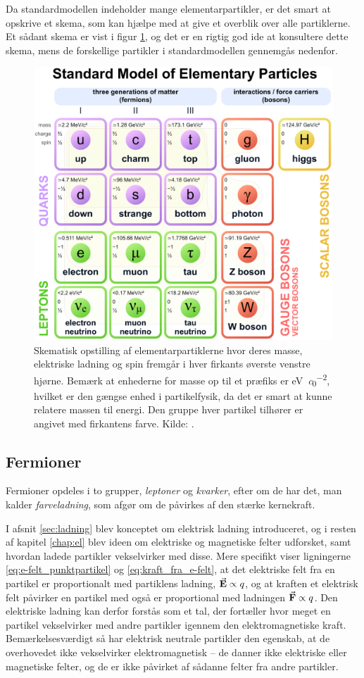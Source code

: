 Da standardmodellen indeholder mange elementarpartikler, er det smart at opskrive et skema, som kan hjælpe med at give et overblik over alle partiklerne. Et sådant skema er vist i figur \ref{fig:standardmodellen}, og det er en rigtig god ide at konsultere dette skema, mens de forskellige partikler i standardmodellen gennemgås nedenfor.
%
\begin{figure}
    \centering
    \includegraphics[width=.75\textwidth]{Partikel/figurer/standardmodellen.eps}
    \caption{Skematisk opstilling af elementarpartiklerne hvor deres masse, elektriske ladning og spin fremgår i hver firkants øverste venstre hjørne. Bemærk at enhederne for masse op til et præfiks er \si{\electronvolt\per\clight\squared}, hvilket er den gængse enhed i partikelfysik, da det er smart at kunne relatere massen til energi. Den gruppe hver partikel tilhører er angivet med firkantens farve. Kilde: \cite{StandardModelWikipedia}.}
    \label{fig:standardmodellen}
\end{figure}

\subsection{Fermioner}
Fermioner opdeles i to grupper, \emph{leptoner} og \emph{kvarker}, efter om de har det, man kalder \textit{farveladning}, som afgør om de påvirkes af den stærke kernekraft.

I afsnit \ref{sec:ladning} blev konceptet om elektrisk ladning introduceret, og i resten af kapitel \ref{chap:el} blev ideen om elektriske og magnetiske felter udforsket, samt hvordan ladede partikler vekselvirker med disse. Mere specifikt viser ligningerne \eqref{eq:e-felt_punktpartikel} og \eqref{eq:kraft_fra_e-felt}, at det elektriske felt fra en partikel er proportionalt med partiklens ladning, $\va E \propto q$, og at kraften et elektrisk felt påvirker en partikel med også er proportional med ladningen $\va F \propto q$. Den elektriske ladning kan derfor forstås som et tal, der fortæller hvor meget en partikel vekselvirker med andre partikler igennem den elektromagnetiske kraft. Bemærkelsesværdigt så har elektrisk neutrale partikler den egenskab, at de overhovedet ikke vekselvirker elektromagnetisk -- de danner ikke elektriske eller magnetiske felter, og de er ikke påvirket af sådanne felter fra andre partikler.

